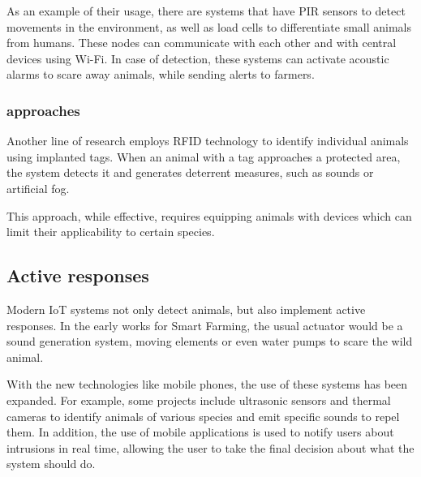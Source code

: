 As an example of their usage, there are systems that have PIR sensors to detect movements in the environment, as well as load cells to differentiate small animals from humans\cite{ImplementationCropProtection}. 
These nodes can communicate with each other and with central devices using Wi-Fi. In case of detection, these systems can activate acoustic alarms to scare away animals, while sending alerts to farmers.

\subsubsection*{ approaches}
Another line of research employs RFID technology to identify individual animals using implanted tags. 
When an animal with a tag approaches a protected area, the system detects it and generates deterrent measures, 
such as sounds or artificial fog. 

This approach, while effective, requires equipping animals with devices which can limit their applicability to certain species.

\clearpage
\subsection{Active responses}
Modern IoT systems not only detect animals, but also implement active responses. In the early works for Smart Farming, the 
usual actuator would be a sound generation system, moving elements or even water pumps to scare the wild animal.

With the new technologies like mobile phones, the use of these systems has been expanded. For example, some projects include ultrasonic sensors 
and thermal cameras to identify animals of various species and emit specific sounds to repel them. 
In addition, the use of mobile applications is used to notify users about intrusions in real time, allowing the user to take the final decision 
about what the system should do.
